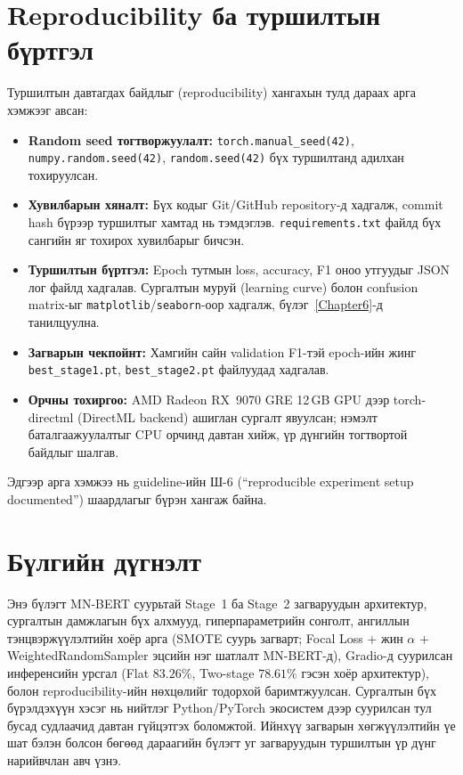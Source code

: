 \section{Reproducibility ба туршилтын бүртгэл}

Туршилтын давтагдах байдлыг (reproducibility) хангахын тулд дараах арга хэмжээг
авсан:

\begin{itemize}
  \item \textbf{Random seed тогтворжуулалт:} \texttt{torch.manual\_seed(42)},
    \texttt{numpy.random.seed(42)}, \texttt{random.seed(42)} бүх туршилтанд
    адилхан тохируулсан.
  \item \textbf{Хувилбарын хяналт:} Бүх кодыг Git/GitHub repository-д хадгалж,
    commit hash бүрээр туршилтыг хамтад нь тэмдэглэв. \texttt{requirements.txt}
    файлд бүх сангийн яг тохирох хувилбарыг бичсэн.
  \item \textbf{Туршилтын бүртгэл:} Epoch тутмын loss, accuracy, F1 оноо утгуудыг
    JSON лог файлд хадгалав. Сургалтын муруй (learning curve) болон
    confusion matrix-ыг \texttt{matplotlib}/\texttt{seaborn}-оор хадгалж,
    бүлэг~\ref{Chapter6}-д танилцуулна.
  \item \textbf{Загварын чекпойнт:} Хамгийн сайн validation F1-тэй epoch-ийн
    жинг \texttt{best\_stage1.pt}, \texttt{best\_stage2.pt} файлуудад хадгалав.
  \item \textbf{Орчны тохиргоо:} AMD Radeon RX~9070 GRE 12\,GB GPU дээр
    torch-directml (DirectML backend) ашиглан сургалт явуулсан; нэмэлт
    баталгаажуулалтыг CPU орчинд давтан хийж, үр дүнгийн тогтвортой байдлыг
    шалгав.
\end{itemize}

Эдгээр арга хэмжээ нь guideline-ийн Ш-6 (``reproducible experiment setup
documented'') шаардлагыг бүрэн хангаж байна.

\section{Бүлгийн дүгнэлт}

Энэ бүлэгт MN-BERT суурьтай Stage~1 ба Stage~2 загваруудын архитектур, сургалтын
дамжлагын бүх алхмууд, гиперпараметрийн сонголт, ангиллын тэнцвэржүүлэлтийн
хоёр арга (SMOTE суурь загварт; Focal Loss + жин $\alpha$ + WeightedRandomSampler
эцсийн нэг шатлалт MN-BERT-д), Gradio-д
суурилсан инференсийн урсгал (Flat $83.26\%$, Two-stage $78.61\%$
гэсэн хоёр архитектур), болон reproducibility-ийн нөхцөлийг
тодорхой баримтжуулсан. Сургалтын бүх бүрэлдэхүүн хэсэг нь нийтлэг Python/PyTorch
экосистем дээр суурилсан тул бусад судлаачид давтан гүйцэтгэх боломжтой. Ийнхүү
загварын хөгжүүлэлтийн үе шат бэлэн болсон бөгөөд дараагийн бүлэгт уг
загваруудын туршилтын үр дүнг нарийвчлан авч үзнэ.
